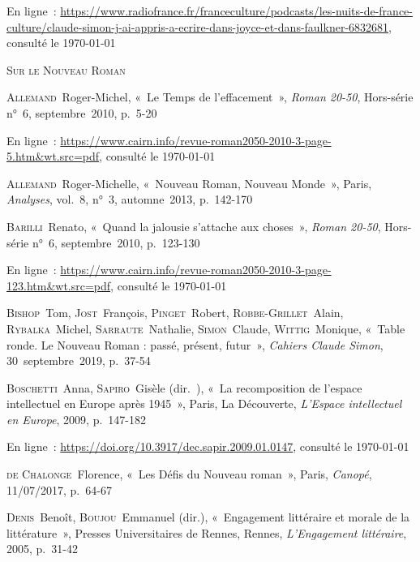 \documentclass[12pt, a4paper]{article}
\begin{document}
            En ligne~: \hyperlink{https://www.radiofrance.fr/franceculture/podcasts/les-nuits-de-france-culture/claude-simon-j-ai-appris-a-ecrire-dans-joyce-et-dans-faulkner-6832681}{https://www.radiofrance.fr/franceculture/podcasts/les-nuits-de-france-culture/claude-simon-j-ai-appris-a-ecrire-dans-joyce-et-dans-faulkner-6832681}, consulté le \today
        \par 
    
        \vspace*{2cm}
        \setlength{\parindent}{0cm}
{\large\textsc{Sur le Nouveau Roman}}
        \vspace*{1cm}
        \setlength{\parindent}{25pt}
        
        
        

        
        \textsc{Allemand}~Roger-Michel, «~Le Temps de l'effacement~»,  \textit{Roman 20-50}, Hors-série n°~6, septembre~2010, p.~5-20
            
            En ligne~: \hyperlink{https://www.cairn.info/revue-roman2050-2010-3-page-5.htm\&wt.src=pdf}{https://www.cairn.info/revue-roman2050-2010-3-page-5.htm\&wt.src=pdf}, consulté le \today
        \par
    \textsc{Allemand}~Roger-Michelle, «~Nouveau Roman, Nouveau Monde~», Paris, \textit{Analyses}, vol.~8, n°~3, automne~2013, p.~142-170\par
    \textsc{Barilli}~Renato, «~Quand la jalousie s'attache aux choses~»,  \textit{Roman 20-50}, Hors-série n°~6, septembre~2010, p.~123-130
            
            En ligne~: \hyperlink{https://www.cairn.info/revue-roman2050-2010-3-page-123.htm\&wt.src=pdf}{https://www.cairn.info/revue-roman2050-2010-3-page-123.htm\&wt.src=pdf}, consulté le \today
        \par
    \textsc{Bishop}~Tom, \textsc{Jost}~François, \textsc{Pinget}~Robert, \textsc{Robbe-Grillet}~Alain, \textsc{Rybalka}~Michel, \textsc{Sarraute}~Nathalie, \textsc{Simon}~Claude, \textsc{Wittig}~Monique, «~Table ronde. Le Nouveau Roman : passé, présent,
                futur~»,  \textit{Cahiers Claude Simon}, 30~septembre~2019, p.~37-54\par
    \textsc{Boschetti}~Anna, \textsc{Sapiro}~Gisèle (dir.~), «~La recomposition de l'espace intellectuel en Europe après 1945~», Paris, La Découverte, \textit{L'Espace intellectuel en Europe}, 2009, p.~147-182

En ligne~: \href{https://doi.org/10.3917/dec.sapir.2009.01.0147}{https://doi.org/10.3917/dec.sapir.2009.01.0147}, consulté le \today\par
    \textsc{de Chalonge}~Florence, «~Les Défis du Nouveau roman~», Paris, \textit{Canopé}, 11/07/2017, p.~64-67\par
    \textsc{Denis}~Benoît, \textsc{Boujou}~Emmanuel (dir.), «~Engagement littéraire et morale de la littérature~», Presses Universitaires de Rennes, Rennes, \textit{L'Engagement littéraire}, 2005, p.~31-42
            
\end{document}
